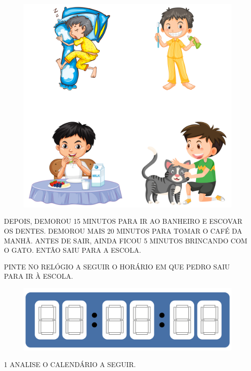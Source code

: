 \begin{figure}[htpb!]
\centering
\includegraphics[width=.6\textwidth]{../ilustracoes/MAT1/SAEB_1ANO_MAT_FIGURA58.png}
\end{figure}

DEPOIS, DEMOROU 15 MINUTOS PARA IR AO BANHEIRO E ESCOVAR OS DENTES.
DEMOROU MAIS 20 MINUTOS PARA TOMAR O CAFÉ DA MANHÃ. ANTES DE SAIR,
AINDA FICOU 5 MINUTOS BRINCANDO COM O GATO. ENTÃO SAIU PARA A ESCOLA.

PINTE NO RELÓGIO A SEGUIR O HORÁRIO EM QUE PEDRO SAIU PARA IR À ESCOLA.


\begin{figure}[htpb!]
\centering
\includegraphics[width=\textwidth]{../ilustracoes/MAT1/SAEB_1ANO_MAT_FIGURA59.png}
\end{figure}


\pagebreak
{}

\num{1} ANALISE O CALENDÁRIO A SEGUIR.

